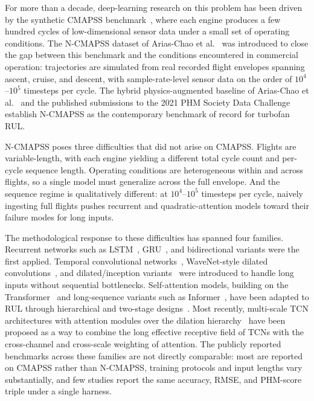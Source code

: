 For more than a decade, deep-learning research on this problem has been driven by the synthetic CMAPSS benchmark~\cite{saxena2008damage}, where each engine produces a few hundred cycles of low-dimensional sensor data under a small set of operating conditions. The N-CMAPSS dataset of Arias-Chao et al.~\cite{ariaschao2021ncmapss} was introduced to close the gap between this benchmark and the conditions encountered in commercial operation: trajectories are simulated from real recorded flight envelopes spanning ascent, cruise, and descent, with sample-rate-level sensor data on the order of $10^4$--$10^5$ timesteps per cycle. The hybrid physics-augmented baseline of Arias-Chao et al.~\cite{ariaschao2022fusing} and the published submissions to the 2021 PHM Society Data Challenge~\cite{lovberg2021variable,devol2021inception,solismartin2021stacked} establish N-CMAPSS as the contemporary benchmark of record for turbofan RUL.

N-CMAPSS poses three difficulties that did not arise on CMAPSS. Flights are variable-length, with each engine yielding a different total cycle count and per-cycle sequence length. Operating conditions are heterogeneous within and across flights, so a single model must generalize across the full envelope. And the sequence regime is qualitatively different: at $10^4$--$10^5$ timesteps per cycle, naively ingesting full flights pushes recurrent and quadratic-attention models toward their failure modes for long inputs.

The methodological response to these difficulties has spanned four families. Recurrent networks such as LSTM~\cite{hochreiter1997lstm}, GRU~\cite{cho2014gru}, and bidirectional variants were the first applied. Temporal convolutional networks~\cite{bai2018tcn}, WaveNet-style dilated convolutions~\cite{oord2016wavenet}, and dilated/inception variants~\cite{lovberg2021variable,devol2021inception} were introduced to handle long inputs without sequential bottlenecks. Self-attention models, building on the Transformer~\cite{vaswani2017attention} and long-sequence variants such as Informer~\cite{zhou2021informer}, have been adapted to RUL through hierarchical and two-stage designs~\cite{fan2024star,ttsnet2025}. Most recently, multi-scale TCN architectures with attention modules over the dilation hierarchy~\cite{xu2024msattn} have been proposed as a way to combine the long effective receptive field of TCNs with the cross-channel and cross-scale weighting of attention. The publicly reported benchmarks across these families are not directly comparable: most are reported on CMAPSS rather than N-CMAPSS, training protocols and input lengths vary substantially, and few studies report the same accuracy, RMSE, and PHM-score triple under a single harness.

